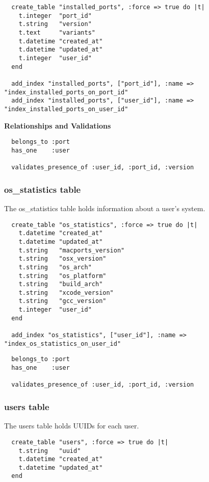 \documentclass[10pt]{article}
\begin{document}
\begin{verbatim}
  create_table "installed_ports", :force => true do |t|
    t.integer  "port_id"
    t.string   "version"
    t.text     "variants"
    t.datetime "created_at"
    t.datetime "updated_at"
    t.integer  "user_id"
  end

  add_index "installed_ports", ["port_id"], :name => "index_installed_ports_on_port_id"
  add_index "installed_ports", ["user_id"], :name => "index_installed_ports_on_user_id"
\end{verbatim}

\textbf{Relationships and Validations}
  
\begin{verbatim}
  belongs_to :port
  has_one    :user
  
  validates_presence_of :user_id, :port_id, :version
\end{verbatim}

\subsubsection{os\_statistics table}

The os\_statistics table holds information about a user's system.

\begin{verbatim}
  create_table "os_statistics", :force => true do |t|
    t.datetime "created_at"
    t.datetime "updated_at"
    t.string   "macports_version"
    t.string   "osx_version"
    t.string   "os_arch"
    t.string   "os_platform"
    t.string   "build_arch"
    t.string   "xcode_version"
    t.string   "gcc_version"
    t.integer  "user_id"
  end

  add_index "os_statistics", ["user_id"], :name => "index_os_statistics_on_user_id"
\end{verbatim}

\begin{verbatim}
  belongs_to :port
  has_one    :user
  
  validates_presence_of :user_id, :port_id, :version
\end{verbatim}

\subsubsection{users table}

The users table holds UUIDs for each user.

\begin{verbatim}
  create_table "users", :force => true do |t|
    t.string   "uuid"
    t.datetime "created_at"
    t.datetime "updated_at"
  end
\end{verbatim}
\end{document}
